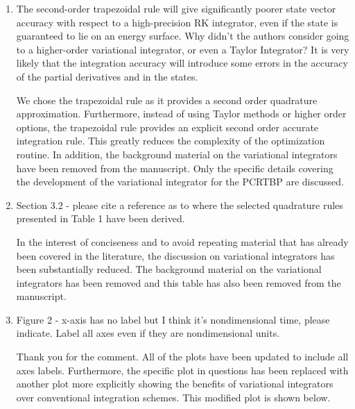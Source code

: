 \documentclass[11pt]{article}
\begin{document}
\begin{enumerate}
\item 
    \begin{itshape}
The second-order trapezoidal rule will give significantly poorer state vector accuracy with respect to a high-precision RK integrator, even if the state is guaranteed to lie on an energy surface.  Why didn't the authors consider going to a higher-order variational integrator, or even a Taylor Integrator?  It is very likely that the integration accuracy will introduce some errors in the accuracy of the partial derivatives and in the states.
\end{itshape}

We chose the trapezoidal rule as it provides a second order quadrature approximation.
Furthermore, instead of using Taylor methods or higher order options, the trapezoidal rule provides an explicit second order accurate integration rule.
This greatly reduces the complexity of the optimization routine.
In addition, the background material on the variational integrators have been removed from the manuscript. 
Only the specific details covering the development of the variational integrator for the PCRTBP are discussed.

\item 
    \begin{itshape}
Section 3.2 - please cite a reference as to where the selected quadrature rules presented in Table 1 have been derived.
\end{itshape}

In the interest of conciseness and to avoid repeating material that has already been covered in the literature, the discussion on variational integrators has been substantially reduced.
The background material on the variational integrators has been removed and this table has also been removed from the manuscript.

\item 
    \begin{itshape}
Figure 2 - x-axis has no label but I think it's nondimensional time, please indicate.  Label all axes even if they are nondimensional units.
\end{itshape}

Thank you for the comment. 
All of the plots have been updated to include all axes labels.
Furthermore, the specific plot in questions has been replaced with another plot more explicitly showing the benefits of variational integrators over conventional integration schemes.
This modified plot is shown below.


\end{enumerate}
\end{document}
